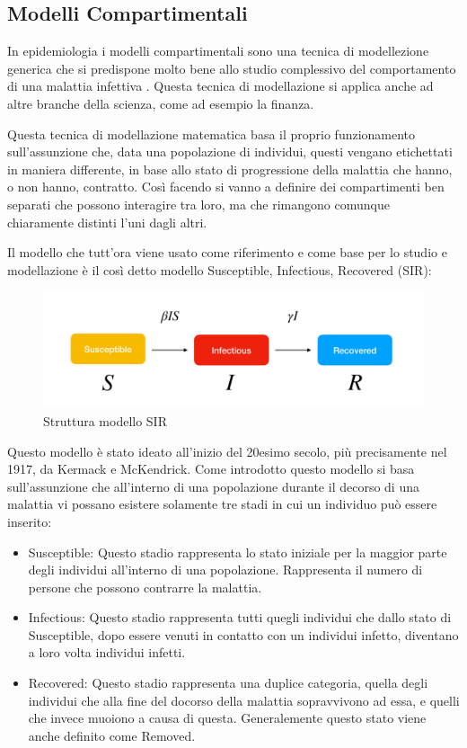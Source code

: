 \subsection{Modelli Compartimentali}
In epidemiologia i modelli compartimentali sono una tecnica di modellezione 
generica che si predispone molto bene allo studio complessivo del comportamento
di una malattia infettiva \cite{wiki:Compartmental_models_in_epidemiology}. 
Questa tecnica di modellazione si applica anche ad altre branche della 
scienza, come ad esempio la finanza.

Questa tecnica di modellazione matematica basa il proprio funzionamento 
sull'assunzione che, data una popolazione di individui, questi vengano 
etichettati in maniera differente, in base allo stato di progressione 
della malattia che hanno, o non hanno, contratto. Così facendo si vanno a 
definire dei compartimenti ben separati che possono interagire tra loro, ma 
che rimangono comunque chiaramente distinti l'uni dagli altri.

Il modello che tutt'ora viene usato come riferimento e come base per 
lo studio e modellazione è il così detto modello 
Susceptible, Infectious, Recovered (SIR):

\begin{figure}[h]
    \includegraphics[width=\linewidth]{img/sir.png}
    \caption{Struttura modello SIR} 
    \label{fig:SIR_Structure}
\end{figure}

Questo modello è stato ideato all'inizio del 20esimo secolo, 
più precisamente nel 1917, da Kermack e McKendrick. Come introdotto questo modello
si basa sull'assunzione che all'interno di una popolazione durante 
il decorso di una malattia vi possano esistere solamente tre stadi in cui 
un individuo può essere inserito: 

\begin{itemize}
    \item Susceptible: Questo stadio rappresenta lo stato iniziale per la maggior parte
    degli individui all'interno di una popolazione. Rappresenta il numero di 
    persone che possono contrarre la malattia.
    \item Infectious: Questo stadio rappresenta tutti quegli individui che dallo 
    stato di Susceptible, dopo essere venuti in contatto con un individui infetto, 
    diventano a loro volta individui infetti.
    \item Recovered: Questo stadio rappresenta una duplice categoria, quella degli
    individui che alla fine del docorso della malattia sopravvivono ad essa, e 
    quelli che invece muoiono a causa di questa. Generalemente questo stato viene
    anche definito come Removed.
\end{itemize}

